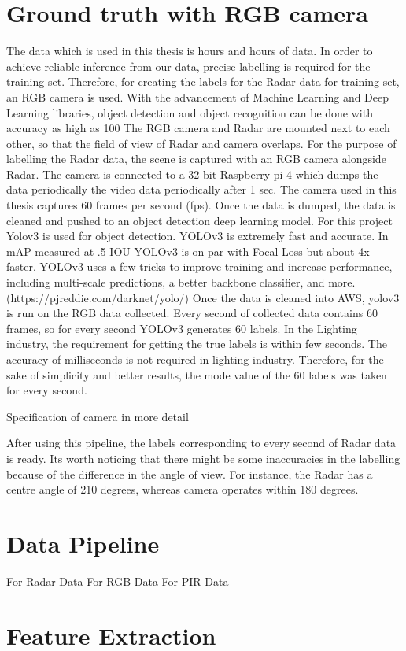 \section{Ground truth with RGB camera}
\label{section:environments}
The data which is used in this thesis is hours and hours of data. In order to achieve reliable inference from our data, precise labelling is required for the training set. Therefore, for creating the labels for the Radar data for training set, an RGB camera is used. 
With the advancement of Machine Learning and Deep Learning libraries, object detection and object recognition can be done with accuracy as high as 100%
The RGB camera and Radar are mounted next to each other, so that the field of view of Radar and camera overlaps. For the purpose of labelling the Radar data, the scene is captured with an RGB camera alongside Radar. The camera is connected to a 32-bit Raspberry pi 4 which dumps the data periodically the video data periodically after 1 sec. The camera used in this thesis captures 60 frames per second (fps).
Once the data is dumped, the data is cleaned and pushed to an object detection deep learning model. For this project Yolov3 is used for object detection. YOLOv3 is extremely fast and accurate. In mAP measured at .5 IOU YOLOv3 is on par with Focal Loss but about 4x faster. YOLOv3 uses a few tricks to improve training and increase performance, including multi-scale predictions, a better backbone classifier, and more. 
(https://pjreddie.com/darknet/yolo/)
Once the data is cleaned into AWS, yolov3 is run on the RGB data collected. Every second of collected data contains 60 frames, so for every second YOLOv3 generates 60 labels. In the Lighting industry, the requirement for getting the true labels is within few seconds. The accuracy of milliseconds is not required in lighting industry. Therefore, for the sake of simplicity and better results, the mode value of the 60 labels was taken for every second. 

Specification of camera in more detail

After using this pipeline, the labels corresponding to every second of Radar data is ready.
Its worth noticing that there might be some inaccuracies in the labelling because of the difference in the angle of view. For instance, the Radar has a centre angle of 210 degrees, whereas camera operates within 180 degrees.


\section{Data Pipeline}
\label{section:environments}
For Radar Data
For RGB Data
For PIR Data


\section{Feature Extraction}
\label{section:environments}



